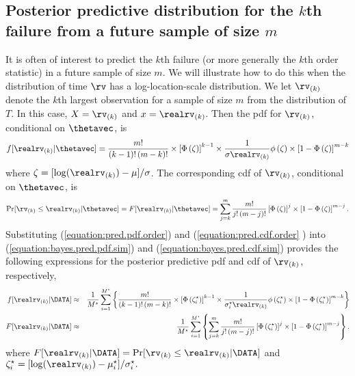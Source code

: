 
\subsection{Posterior predictive distribution for the $k$th failure from 
a future sample of size $m$}
\label{section:pred.dist.order.stat}
It is often of interest to predict the $k$th failure (or more
generally the $k$th order statistic) in a future sample of size $m$.
We will illustrate how to do this when the distribution of time $\rv$
has a log-location-scale distribution. We let $\rv_{(k)}$
denote the $k$th largest observation for a sample of size $m$ from the
distribution of $T$.  In this case, $X=\rv_{(k)}$ and
$x=\realrv_{(k)}$. Then the pdf for $\rv_{(k)}$, conditional on
$\thetavec$, is
\begin{equation}
\label{equation:pred.pdf.order}
f[\realrv_{(k)}|\thetavec]=
\frac{m!}{(k-1)!\, (m-k)!}\times \left [\Phi\left (\zeta\right )\right ]^{k-1}
\times
\frac{1}{\sigma \realrv_{(k)}} \phi\left (\zeta\right )
\times
\left [1-\Phi\left (\zeta\right )\right ]^{m-k}
\end{equation}
where $\zeta=[\log(\realrv_{(k)})-\mu]/\sigma$.  
The corresponding cdf of $\rv_{(k)}$, conditional on
$\thetavec$, is
\begin{equation}
\label{equation:pred.cdf.order}
\Pr[ \rv_{(k)} \leq \realrv_{(k)}  | \thetavec  ] = F[\realrv_{(k)}|\thetavec]=
\sum_{j=k}^{m}
\frac{m!}{j!\,(m-j)!}\left [\Phi\left (\zeta\right )\right ]^{j}
\times
\left [1-\Phi\left (\zeta\right )\right ]^{m-j}.
\end{equation}
Substituting (\ref{equation:pred.pdf.order}) and 
(\ref{equation:pred.cdf.order} ) into
(\ref{equation:bayes.pred.pdf.sim}) 
and (\ref{equation:bayes.pred.cdf.sim}) 
provides the following  expressions for the
posterior predictive pdf and cdf of $\rv_{(k)}$, respectively,
\begin{eqnarray*}
f[\realrv_{(k)} |\DATA] & \approx & \frac{1}{M^{\star}} \sum_{i=1}^{M^{\star}}
\left \{
\frac{m!}{(k-1)!\, (m-k)!}\times \left [\Phi\left (\zeta^{\star}_{i}\right )\right ]^{k-1}
\times
\frac{1}{\sigma_{i}^{\star} \realrv_{(k)}} \phi\left (\zeta^{\star}_{i}\right )
\times
\left [1-\Phi\left (\zeta^{\star}_{i}\right )\right ]^{m-k}
\right \}
\\
F[\realrv_{(k)}|\DATA]
 &\approx  & \frac{1}{M^{\star}} \sum_{i=1}^{M^{\star}}
\left \{
\sum_{j=k}^{m}
\frac{m!}{j!\,(m-j)!}\left [\Phi\left (\zeta^{\star}_{i}\right )\right ]^{j}
\times
\left [1-\Phi\left (\zeta^{\star}_{i}\right )\right ]^{m-j}
\right \}.
\end{eqnarray*}
where
$F[\realrv_{(k)}|\DATA]=
\Pr[ \rv_{(k)} \leq \realrv_{(k)}  | \DATA  ]
$ and
$
\zeta^{\star}_{i}=[\log(\realrv_{(k)})-\mu_{i}^{\star}]/
      \sigma_{i}^{\star}.
$


